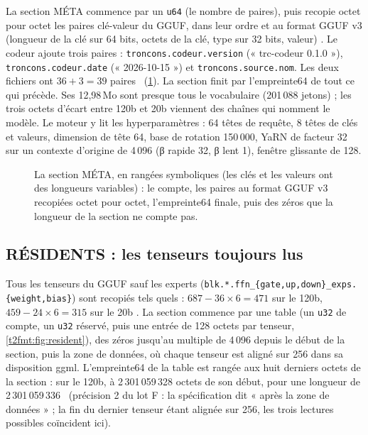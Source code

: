 La section MÉTA commence par un \texttt{u64} (le nombre de paires), puis recopie octet pour octet les paires clé-valeur du GGUF, dans leur ordre et au format GGUF v3 (longueur de la clé sur 64 bits, octets de la clé, type sur 32 bits, valeur) \cite{ggml_gguf}. Le codeur ajoute trois paires : \nolinkurl{troncons.codeur.version} (« trc-codeur 0.1.0 »), \nolinkurl{troncons.codeur.date} (« 2026-10-15 ») et \nolinkurl{troncons.source.nom}. Les deux fichiers ont $36 + 3 = 39$ paires \mes~(\cref{t2fmt:fig:meta}). La section finit par l'empreinte64 de tout ce qui précède. Ses 12,98\,Mo sont presque tous le vocabulaire (201\,088 jetons) ; les trois octets d'écart entre 120b et 20b viennent des chaînes qui nomment le modèle. Le moteur y lit les hyperparamètres : 64 têtes de requête, 8 têtes de clés et valeurs, dimension de tête 64, base de rotation 150\,000, YaRN de facteur 32 sur un contexte d'origine de 4\,096 (β rapide 32, β lent 1), fenêtre glissante de 128.

\begin{figure}[ht]
\centering
\TdFmtMeta
\caption[La section MÉTA]{La section MÉTA, en rangées symboliques (les clés et les valeurs ont des longueurs variables) : le compte, les paires au format GGUF v3 recopiées octet pour octet, l'empreinte64 finale, puis des zéros que la longueur de la section ne compte pas.}
\label{t2fmt:fig:meta}
\end{figure}

\subsection{RÉSIDENTS : les tenseurs toujours lus}

Tous les tenseurs du GGUF sauf les experts (\nolinkurl{blk.*.ffn_{gate,up,down}_exps.{weight,bias}}) sont recopiés tels quels : $687 - 36 \times 6 = 471$ sur le 120b, $459 - 24 \times 6 = 315$ sur le 20b \calc. La section commence par une table (un \texttt{u32} de compte, un \texttt{u32} réservé, puis une entrée de 128 octets par tenseur, \cref{t2fmt:fig:resident}), des zéros jusqu'au multiple de 4\,096 depuis le début de la section, puis la zone de données, où chaque tenseur est aligné sur 256 dans sa disposition ggml. L'empreinte64 de la table est rangée aux huit derniers octets de la section : sur le 120b, à 2\,301\,059\,328 octets de son début, pour une longueur de 2\,301\,059\,336 \mes~(précision 2 du lot F : la spécification dit « après la zone de données » ; la fin du dernier tenseur étant alignée sur 256, les trois lectures possibles coïncident ici).

